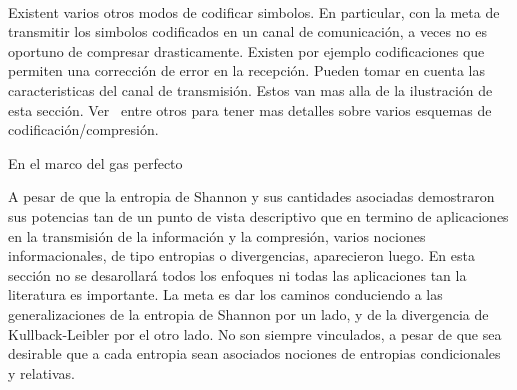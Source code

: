 \

Existent varios otros modos de codificar simbolos. En particular, con la meta de
transmitir los simbolos codificados en un canal de comunicaci\'on, a veces no es
oportuno  de compresar  drasticamente.  Existen  por ejemplo  codificaciones que
permiten una correcci\'on de error en la recepci\'on. Pueden tomar en cuenta las
caracteristicas  del  canal  de  transmisi\'on.    Estos  van  mas  alla  de  la
ilustraci\'on  de  esta  secci\'on.   Ver~\cite{Ber74, Gal78,  Say03,  CovTho06,
  Rio07}  entre  otros  para  tener   mas  detalles  sobre  varios  esquemas  de
codificaci\'on/compresi\'on.




\label{sec:SZ:GasPerfecto}

En el marco del gas perfecto




\label{sec:SZ:Generalizadas}

A pesar de que la entropia de Shannon y sus cantidades asociadas demostraron sus
potencias tan de un punto de vista descriptivo que en termino de aplicaciones en
la  transmisi\'on  de  la  informaci\'on  y  la  compresi\'on,  varios  nociones
informacionales, de  tipo entropias o  divergencias, aparecieron luego.  En esta
secci\'on no se  desarollar\'a todos los enfoques ni  todas las aplicaciones tan
la  literatura es  importante. La  meta  es dar  los caminos  conduciendo a  las
generalizaciones de la  entropia de Shannon por un lado, y  de la divergencia de
Kullback-Leibler por el otro lado. No son siempre vinculados, a pesar de que sea
desirable que a cada entropia sean asociados nociones de entropias condicionales
y relativas.


